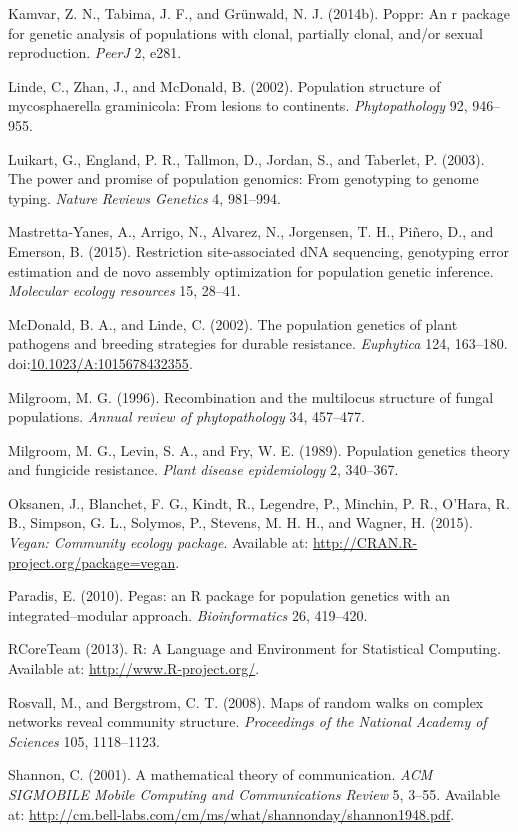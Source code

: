 \documentclass{frontiersSCNS} %
\begin{document}
Kamvar, Z. N., Tabima, J. F., and Gr{ü}nwald, N. J. (2014b). Poppr: An r
package for genetic analysis of populations with clonal, partially
clonal, and/or sexual reproduction. \emph{PeerJ} 2, e281.

Linde, C., Zhan, J., and McDonald, B. (2002). Population structure of
mycosphaerella graminicola: From lesions to continents.
\emph{Phytopathology} 92, 946--955.

Luikart, G., England, P. R., Tallmon, D., Jordan, S., and Taberlet, P.
(2003). The power and promise of population genomics: From genotyping to
genome typing. \emph{Nature Reviews Genetics} 4, 981--994.

Mastretta-Yanes, A., Arrigo, N., Alvarez, N., Jorgensen, T. H.,
Pi{ñ}ero, D., and Emerson, B. (2015). Restriction site-associated dNA
sequencing, genotyping error estimation and de novo assembly
optimization for population genetic inference. \emph{Molecular ecology
resources} 15, 28--41.

McDonald, B. A., and Linde, C. (2002). The population genetics of plant
pathogens and breeding strategies for durable resistance.
\emph{Euphytica} 124, 163--180.
doi:\href{http://dx.doi.org/10.1023/A:1015678432355}{10.1023/A:1015678432355}.

Milgroom, M. G. (1996). Recombination and the multilocus structure of
fungal populations. \emph{Annual review of phytopathology} 34, 457--477.

Milgroom, M. G., Levin, S. A., and Fry, W. E. (1989). Population
genetics theory and fungicide resistance. \emph{Plant disease
epidemiology} 2, 340--367.

Oksanen, J., Blanchet, F. G., Kindt, R., Legendre, P., Minchin, P. R.,
O'Hara, R. B., Simpson, G. L., Solymos, P., Stevens, M. H. H., and
Wagner, H. (2015). \emph{Vegan: Community ecology package}. Available
at: \url{http://CRAN.R-project.org/package=vegan}.

Paradis, E. (2010). Pegas: an R package for population genetics with an
integrated--modular approach. \emph{Bioinformatics} 26, 419--420.

RCoreTeam (2013). R: A Language and Environment for Statistical
Computing. Available at: \url{http://www.R-project.org/}.

Rosvall, M., and Bergstrom, C. T. (2008). Maps of random walks on
complex networks reveal community structure. \emph{Proceedings of the
National Academy of Sciences} 105, 1118--1123.

Shannon, C. (2001). A mathematical theory of communication. \emph{ACM
SIGMOBILE Mobile Computing and Communications Review} 5, 3--55.
Available at:
\url{http://cm.bell-labs.com/cm/ms/what/shannonday/shannon1948.pdf}.
\end{document}
